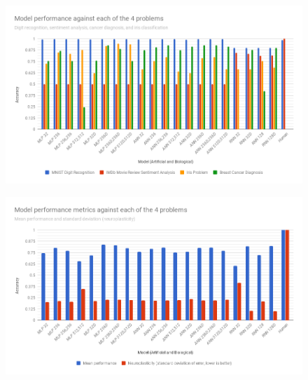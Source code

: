 \documentclass[]{report}
\begin{document}
\begin{figure}[H]
	\centering
	\includegraphics[width=\linewidth]{chart.png}
	\label{fig:chart0}
\end{figure}

\begin{figure}[H]
	\centering
	\includegraphics[width=\linewidth]{chart1.png}
	\label{fig:chart1}
\end{figure}
\end{document}

